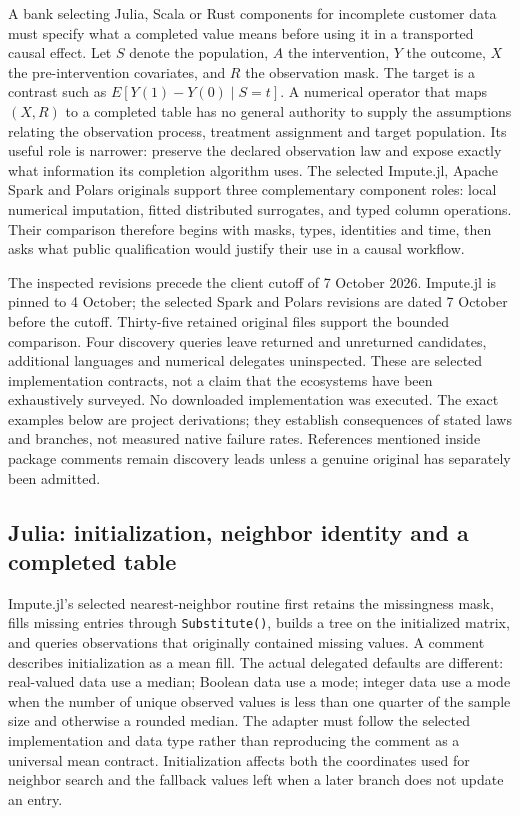 A bank selecting Julia, Scala or Rust components for incomplete customer data must specify what a completed value means before using it in a transported causal effect. Let $S$ denote the population, $A$ the intervention, $Y$ the outcome, $X$ the pre-intervention covariates, and $R$ the observation mask. The target is a contrast such as $E[Y(1)-Y(0)\mid S=t]$. A numerical operator that maps $(X,R)$ to a completed table has no general authority to supply the assumptions relating the observation process, treatment assignment and target population. Its useful role is narrower: preserve the declared observation law and expose exactly what information its completion algorithm uses. The selected Impute.jl, Apache Spark and Polars originals support three complementary component roles: local numerical imputation, fitted distributed surrogates, and typed column operations. Their comparison therefore begins with masks, types, identities and time, then asks what public qualification would justify their use in a causal workflow.~\citep{exec25_otm_imputejl,exec25_otm_spark,exec25_otm_polars,exec25_otm_choice}

The inspected revisions precede the client cutoff of 7 October 2026. Impute.jl is pinned to 4 October; the selected Spark and Polars revisions are dated 7 October before the cutoff. Thirty-five retained original files support the bounded comparison. Four discovery queries leave returned and unreturned candidates, additional languages and numerical delegates uninspected. These are selected implementation contracts, not a claim that the ecosystems have been exhaustively surveyed. No downloaded implementation was executed. The exact examples below are project derivations; they establish consequences of stated laws and branches, not measured native failure rates. References mentioned inside package comments remain discovery leads unless a genuine original has separately been admitted.~\citep{exec25_otm_choice}

\subsection{Julia: initialization, neighbor identity and a completed table}

Impute.jl's selected nearest-neighbor routine first retains the missingness mask, fills missing entries through \texttt{Substitute()}, builds a tree on the initialized matrix, and queries observations that originally contained missing values. A comment describes initialization as a mean fill. The actual delegated defaults are different: real-valued data use a median; Boolean data use a mode; integer data use a mode when the number of unique observed values is less than one quarter of the sample size and otherwise a rounded median. The adapter must follow the selected implementation and data type rather than reproducing the comment as a universal mean contract. Initialization affects both the coordinates used for neighbor search and the fallback values left when a later branch does not update an entry.~\citep{exec25_otm_imputejl}

